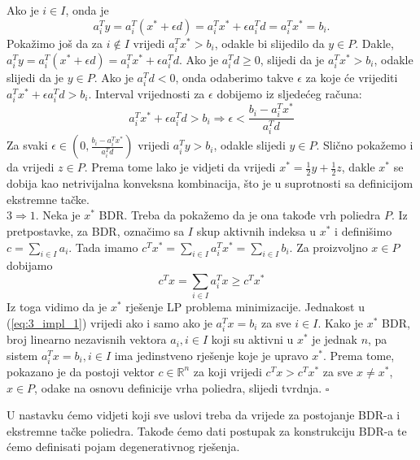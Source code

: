 \documentclass[a4paper, utf8, 11pt, colorlinks]{book}
\newenvironment{proof}{{Dokaz:}}{\hfill$\square$}
\begin{document}
\begin{proof}
       Ako je $i \in I$, onda je $$a_i^T y = a_i^T (x^* + \epsilon d) = a_i^T x^* + \epsilon a_i^T d = a_i^T x^* = b_i. $$
       Pokažimo još da za $i \not \in I$ vrijedi $a_i^T x^* > b_i$, odakle bi slijedilo da $y \in P$. Dakle, $a_i^T y = a_i^T (x^* + \epsilon d) = a_i^T x^* + \epsilon a_i^T d $. Ako je $a_i^T d \geq 0$, slijedi da je 
       $a_i^T x^* > b_i$, odakle slijedi da je $y \in  P$. Ako je $a_i^T d < 0$, onda odaberimo takve $\epsilon$ za koje će vrijediti $a_i^T x^* + \epsilon a_i^T d > b_i$. Interval   vrijednosti za $\epsilon$ dobijemo iz sljedećeg računa:
       $$ a_i^T x^* + \epsilon a_i^T d > b_i \Rightarrow \epsilon < \frac{b_i - a_i^T x^*}{a_i^T d}  $$
       Za svaki $\epsilon \in (0,  \frac{b_i - a_i^T x^*}{a_i^T d} )$ vrijedi $a_i^T y > b_i$, odakle slijedi $y \in P$. Slično pokažemo i da vrijedi $z \in P$. 
       Prema tome lako je vidjeti da vrijedi $x^* = \frac{1}{2}y +\frac{1}{2} z$, dakle $x^*$ se dobija kao netrivijalna konveksna kombinacija, što je u suprotnosti sa definicijom ekstremne tačke. \\
       $3 \Rightarrow 1$. Neka je $x^*$ BDR. Treba da pokažemo da je ona takođe vrh poliedra $P$. Iz pretpostavke, za BDR, označimo sa $I$ skup aktivnih indeksa u $x^*$ i definišimo $c = \sum_{i \in I} a_i$.  Tada imamo 
       $ c^T x^* = \sum_{i \in I } a_i^T x^* = \sum_{i \in I} b_i$. Za proizvoljno $x \in P$ dobijamo
       \begin{equation}\label{eq:3_impl_1}
          c^T x = \sum_{i \in I} a_i^T x \geq c^T x^*  
       \end{equation}
     Iz toga vidimo da je $x^*$ rješenje LP problema minimizacije. Jednakost u (\ref{eq:3_impl_1}) vrijedi ako i samo ako je $a_i^T x = b_i$ za sve $i \in I$. Kako je $x^*$ BDR, broj linearno nezavisnih vektora $a_i, i \in I$ koji su  aktivni u $x^*$ je jednak $n$, pa sistem $a_i^T x = b_i, i \in I$ ima jedinstveno rješenje koje je upravo $x^*$. Prema tome, pokazano je da postoji vektor $c \in \mathbb{R}^n$ za koji vrijedi $c^T x > c^T x^*$ za sve $x \neq x^*$, $x \in P$, odake na osnovu definicije vrha poliedra, slijedi tvrdnja. 
\end{proof}

U nastavku ćemo vidjeti koji sve uslovi treba da vrijede za postojanje BDR-a
i ekstremne tačke poliedra. Takođe ćemo dati postupak za konstrukciju BDR-a te ćemo definisati pojam degenerativnog rješenja.
\end{document}
